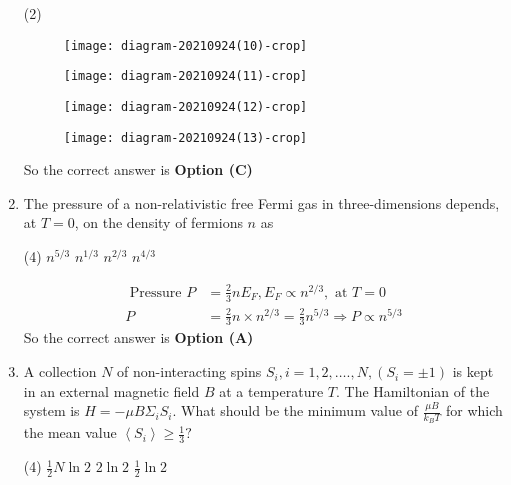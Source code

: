 \begin{enumerate}
\begin{tasks}(2)
	\task[\textbf{A.}] \begin{figure}[H]
		\centering
		\texttt{[image: diagram-20210924(10)-crop]}
	\end{figure}
	\task[\textbf{B.}] \begin{figure}[H]
		\centering
		\texttt{[image: diagram-20210924(11)-crop]}
	\end{figure}
	\task[\textbf{C.}] \begin{figure}[H]
		\centering
		\texttt{[image: diagram-20210924(12)-crop]}
	\end{figure}
	\task[\textbf{D.}] \begin{figure}[H]
		\centering
		\texttt{[image: diagram-20210924(13)-crop]}
	\end{figure}
\end{tasks}
\begin{answer}
	So the correct answer is \textbf{Option (C)}	
\end{answer}
	\item The pressure of a non-relativistic free Fermi gas in three-dimensions depends, at $T=0$, on the density of fermions $n$ as
	{}
\begin{tasks}(4)
	\task[\textbf{A.}] $n^{5 / 3}$
	\task[\textbf{B.}] $n^{1 / 3}$
	\task[\textbf{C.}]  $n^{2 / 3}$
	\task[\textbf{D.}] $n^{4 / 3}$
\end{tasks}
\begin{answer}
	\begin{align*}
	\text{	Pressure }P&=\frac{2}{3} n E_{F}, E_{F} \propto n^{2 / 3},\text{ at }T=0\\
	P&=\frac{2}{3} n \times n^{2 / 3}=\frac{2}{3} n^{5 / 3} \Rightarrow P \propto n^{5 / 3}
	\end{align*}
	So the correct answer is \textbf{Option (A)}
\end{answer}
	\item A collection $N$ of non-interacting spins $S_{i}, i=1,2, \ldots ., N,\left(S_{i}=\pm 1\right)$ is kept in an external magnetic field $B$ at a temperature $T .$ The Hamiltonian of the system is $H=-\mu B \Sigma_{i} S_{i} .$ What should be the minimum value of $\frac{\mu B}{k_{B} T}$ for which the mean value $\left\langle S_{i}\right\rangle \geq \frac{1}{3} ?$
	{}
\begin{tasks}(4)
	\task[\textbf{A.}]  $\frac{1}{2} N \ln 2$
	\task[\textbf{B.}] $2 \ln 2$
	\task[\textbf{C.}] $\frac{1}{2} \ln 2$

\end{tasks}
\end{enumerate}
